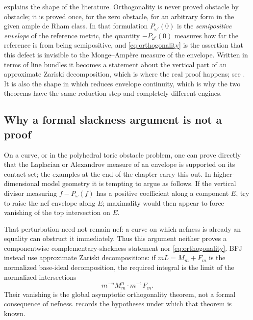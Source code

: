 \begin{remark}
\label{rem:ch27-zero-obstacle}
 explains the shape of the
literature.  Orthogonality is never proved obstacle by obstacle; it is
proved once, for the zero obstacle, for an arbitrary form in the given
ample de Rham class.  In that formulation $P_{\omega'}(0)$ is the
\emph{semipositive envelope} of the reference metric, the quantity
$-P_{\omega'}(0)$ measures how far the reference is from being
semipositive, and \eqref{eq:orthogonality} is the assertion that this defect
is invisible to the Monge--Amp\`ere measure of the envelope.  Written in
terms of line bundles it becomes a statement about the vertical part of an
approximate Zariski decomposition, which is where the real proof happens;
see .  It is also the shape in which
 reduces envelope continuity, which
is why the two theorems have the same reduction step and completely
different engines.
\end{remark}

\subsection{Why a formal slackness argument is not a proof}
\label{sec:ch27-orthogonality-heuristic}

\begin{remark}
\label{rem:model-slackness-heuristic}
On a curve, or in the polyhedral toric obstacle problem, one can prove
directly that the Laplacian or Alexandrov measure of an envelope is supported
on its contact set; the examples at the end of the chapter carry this out.
In higher-dimensional model geometry it is tempting to argue as follows.  If
the vertical divisor measuring $f-P_\omega(f)$ has a positive coefficient
along a component $E$, try to raise the nef envelope along $E$; maximality
would then appear to force vanishing of the top intersection on $E$.

That perturbation need not remain nef: a curve on which nefness is already
an equality can obstruct it immediately.  Thus this argument neither proves
a componentwise complementary-slackness statement nor
\eqref{eq:orthogonality}.  BFJ instead use approximate Zariski decompositions:
if $mL=M_m+F_m$ is the normalized base-ideal decomposition, the required
integral is the limit of the normalized intersections
\[
                  m^{-n}M_m^n\cdot m^{-1}F_m.
\]
Their vanishing is the global asymptotic orthogonality theorem, not a formal
consequence of nefness.   records
the hypotheses under which that theorem is known.
\end{remark}

